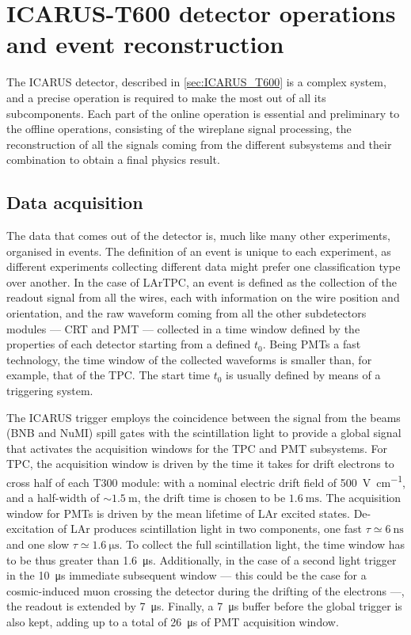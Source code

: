 
\chapter{ICARUS-T600 detector operations and event reconstruction}
\label{chap:event_reconstruction}

The ICARUS detector, described in \autoref{sec:ICARUS_T600} is a complex system, and a precise operation is required to make the most out of all its subcomponents. Each part of the online operation is essential and preliminary to the offline operations, consisting of the wireplane signal processing, the reconstruction of all the signals coming from the different subsystems and their combination to obtain a final physics result. 

\section{Data acquisition}

The data that comes out of the detector is, much like many other experiments, organised in events. The definition of an event is unique to each experiment, as different experiments collecting different data might prefer one classification  type over another. In the case of LArTPC, an event is defined as the collection of the readout signal from all the wires, each with information on the wire position and orientation, and the raw waveform coming from all the other subdetectors modules --- CRT and PMT --- collected in a time window defined by the properties of each detector starting from a defined $t_0$. Being PMTs a fast technology, the time window of the collected waveforms is smaller than, for example, that of the TPC. The start time $t_0$ is usually defined by means of a triggering system. 

The ICARUS trigger employs the coincidence between the signal from the beams (BNB and NuMI) spill gates with the scintillation light to provide a global signal that activates  the acquisition windows for the TPC and PMT subsystems. For TPC, the acquisition window is driven by the time it takes for drift electrons to cross half of each T300 module: with a nominal electric drift field of \SI{500}{\volt\per\cm}, and a half-width of $\sim\SI{1.5}{\m}$, the drift time is chosen to be $\SI{1.6}{\ms}$. The acquisition window for PMTs is driven by the mean lifetime of LAr excited states. De-excitation of LAr produces scintillation light in two components, one fast $\tau\simeq \SI{6}{\ns}$ and one slow $\tau\simeq\SI{1.6}{\us}$. To collect the full scintillation light, the time window has to be thus greater than \SI{1.6}{\us}. Additionally, in the case of a second light trigger in the \SI{10}{\us} immediate subsequent window --- this could be the case for a cosmic-induced muon crossing the detector during the drifting of the electrons ---, the readout is extended by \SI{7}{\us}. Finally, a \SI{7}{\us} buffer before the global trigger is also kept, adding up to a total of \SI{26}{\us} of PMT acquisition window.  

